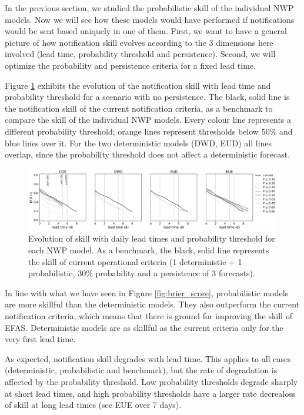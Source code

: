 \documentclass[preprint,12pt]{elsarticle}
\begin{document}
In the previous section, we studied the probabilistic skill of the individual NWP models. Now we will see how these models would have performed if notifications would be sent based uniquely in one of them. First, we want to have a general picture of how notification skill evolves according to the 3 dimensions here involved (lead time, probability threshold and persistence). Second, we will optimize the probability and persistence criteria for a fixed lead time.

Figure \ref{fig:NWP_skill_leadtime} exhibits the evolution of the notification skill with lead time and probability threshold for a scenario with no persistence. The black, solid line is the notification skill of the current notification criteria, as a benchmark to compare the skill of the individual NWP models. Every colour line represents a different probability threshold; orange lines represent thresholds below 50\% and blue lines over it. For the two deterministic models (DWD, EUD) all lines overlap, since the probability threshold does not affect a deterministic forecast.

\begin{figure}
    \centering
    \includegraphics[width=1\textwidth]{figures/skill_probability_leadtime_1-1_NWP.jpg}
    \caption{Evolution of skill with daily lead times and probability threshold for each NWP model. As a benchmark, the black, solid line represents the skill of current operational criteria (1 deterministic + 1 probabilistic, 30\% probability and a persistence of 3 forecasts).}
    \label{fig:NWP_skill_leadtime}
\end{figure}

In line with what we have seen in Figure \ref{fig:brier_score}, probabilistic models are more skillful than the deterministic models. They also outperform the current notification criteria, which means that there is ground for improving the skill of EFAS. Deterministic models are as skillful as the current criteria only for the very first lead time.

As expected, notification skill degrades with lead time. This applies to all cases (deterministic, probabilistic and benchmark), but the rate of degradation is affected by the probability threshold. Low probability thresholds degrade sharply at short lead times, and high probability thresholds have a larger rate decrealoss of skill at long lead times (see EUE over 7 days). 
\end{document}
